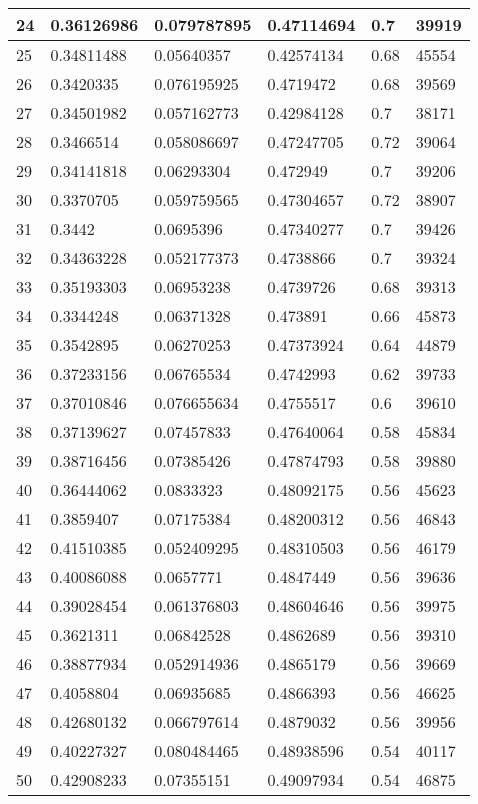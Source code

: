 \begin{longtable}{|l|l|l|l|l|l|}
24 & 0.36126986 & 0.079787895 & 0.47114694 & 0.7 & 39919 \\ \hline 
25 & 0.34811488 & 0.05640357 & 0.42574134 & 0.68 & 45554 \\ \hline 
26 & 0.3420335 & 0.076195925 & 0.4719472 & 0.68 & 39569 \\ \hline 
27 & 0.34501982 & 0.057162773 & 0.42984128 & 0.7 & 38171 \\ \hline 
28 & 0.3466514 & 0.058086697 & 0.47247705 & 0.72 & 39064 \\ \hline 
29 & 0.34141818 & 0.06293304 & 0.472949 & 0.7 & 39206 \\ \hline 
30 & 0.3370705 & 0.059759565 & 0.47304657 & 0.72 & 38907 \\ \hline 
31 & 0.3442 & 0.0695396 & 0.47340277 & 0.7 & 39426 \\ \hline 
32 & 0.34363228 & 0.052177373 & 0.4738866 & 0.7 & 39324 \\ \hline 
33 & 0.35193303 & 0.06953238 & 0.4739726 & 0.68 & 39313 \\ \hline 
34 & 0.3344248 & 0.06371328 & 0.473891 & 0.66 & 45873 \\ \hline 
35 & 0.3542895 & 0.06270253 & 0.47373924 & 0.64 & 44879 \\ \hline 
36 & 0.37233156 & 0.06765534 & 0.4742993 & 0.62 & 39733 \\ \hline 
37 & 0.37010846 & 0.076655634 & 0.4755517 & 0.6 & 39610 \\ \hline 
38 & 0.37139627 & 0.07457833 & 0.47640064 & 0.58 & 45834 \\ \hline 
39 & 0.38716456 & 0.07385426 & 0.47874793 & 0.58 & 39880 \\ \hline 
40 & 0.36444062 & 0.0833323 & 0.48092175 & 0.56 & 45623 \\ \hline 
41 & 0.3859407 & 0.07175384 & 0.48200312 & 0.56 & 46843 \\ \hline 
42 & 0.41510385 & 0.052409295 & 0.48310503 & 0.56 & 46179 \\ \hline 
43 & 0.40086088 & 0.0657771 & 0.4847449 & 0.56 & 39636 \\ \hline 
44 & 0.39028454 & 0.061376803 & 0.48604646 & 0.56 & 39975 \\ \hline 
45 & 0.3621311 & 0.06842528 & 0.4862689 & 0.56 & 39310 \\ \hline 
46 & 0.38877934 & 0.052914936 & 0.4865179 & 0.56 & 39669 \\ \hline 
47 & 0.4058804 & 0.06935685 & 0.4866393 & 0.56 & 46625 \\ \hline 
48 & 0.42680132 & 0.066797614 & 0.4879032 & 0.56 & 39956 \\ \hline 
49 & 0.40227327 & 0.080484465 & 0.48938596 & 0.54 & 40117 \\ \hline 
50 & 0.42908233 & 0.07355151 & 0.49097934 & 0.54 & 46875 \\ \hline 
\end{longtable}
